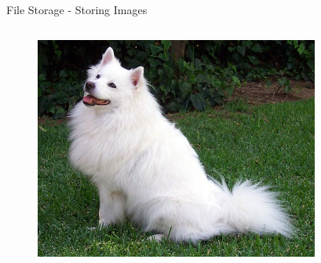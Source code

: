 \begin{frame}{File Storage - Storing Images}
\begin{columns}
    \begin{column}{0.47\textwidth}
    \begin{figure}
        \centering
        \includegraphics[width=\textwidth,height=0.45\textheight,keepaspectratio]{img/dog.jpg}
        \label{fig:my_label}
    \end{figure}
    \end{column}
    \begin{column}{0.47\textwidth}
    \begin{figure}
        \centering

\end{figure}
\end{column}
\end{columns}
\end{frame}
